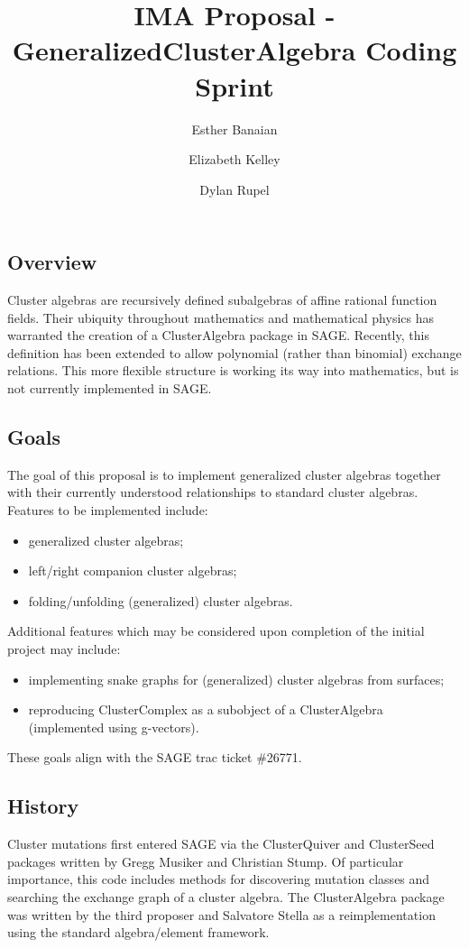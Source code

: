 \documentclass{amsart}
\title{IMA Proposal - GeneralizedClusterAlgebra Coding Sprint}
\author{Esther Banaian}
\author{Elizabeth Kelley}
\author{Dylan Rupel}
\begin{document}
  \maketitle

  \subsection*{Overview}
  Cluster algebras are recursively defined subalgebras of affine rational function fields.
  Their ubiquity throughout mathematics and mathematical physics has warranted the creation of a ClusterAlgebra package in SAGE.
  Recently, this definition has been extended to allow polynomial (rather than binomial) exchange relations.
 This more flexible structure is working its way into mathematics, but is not currently implemented in SAGE.

  \subsection*{Goals}
  The goal of this proposal is to implement generalized cluster algebras together with their currently understood relationships to standard cluster algebras.
  Features to be implemented include:
  \begin{itemize}
    \item generalized cluster algebras;
    \item left/right companion cluster algebras;
    \item folding/unfolding (generalized) cluster algebras.
  \end{itemize}
  Additional features which may be considered upon completion of the initial project may include:
  \begin{itemize}
    \item implementing snake graphs for (generalized) cluster algebras from surfaces;
    \item reproducing ClusterComplex as a subobject of a ClusterAlgebra (implemented using g-vectors).
  \end{itemize}
  These goals align with the SAGE trac ticket \#26771.

  \subsection*{History}
  Cluster mutations first entered SAGE via the ClusterQuiver and ClusterSeed packages written by Gregg Musiker and Christian Stump.  
  Of particular importance, this code includes methods for discovering mutation classes and searching the exchange graph of a cluster algebra.
  The ClusterAlgebra package was written by the third proposer and Salvatore Stella as a reimplementation using the standard algebra/element framework.
\end{document}
